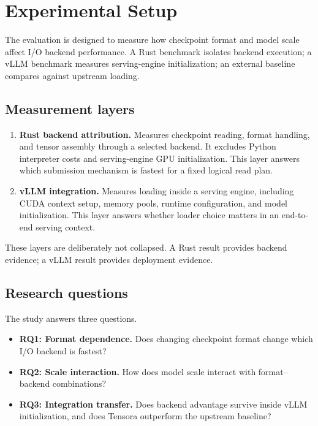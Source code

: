 \section{Experimental Setup}
\label{sec:experimental_setup}

The evaluation is designed to measure how checkpoint format and model scale affect I/O backend performance. A Rust benchmark isolates backend execution; a vLLM benchmark measures serving-engine initialization; an external baseline compares against upstream loading.

\subsection{Measurement layers}

\begin{enumerate}
\item \textbf{Rust backend attribution.} Measures checkpoint reading, format handling, and tensor assembly through a selected backend. It excludes Python interpreter costs and serving-engine GPU initialization. This layer answers which submission mechanism is fastest for a fixed logical read plan.
\item \textbf{vLLM integration.} Measures loading inside a serving engine, including CUDA context setup, memory pools, runtime configuration, and model initialization. This layer answers whether loader choice matters in an end-to-end serving context.
\end{enumerate}

These layers are deliberately not collapsed. A Rust result provides backend evidence; a vLLM result provides deployment evidence.

\subsection{Research questions}

The study answers three questions.
\begin{itemize}
\item \textbf{RQ1: Format dependence.} Does changing checkpoint format change which I/O backend is fastest?
\item \textbf{RQ2: Scale interaction.} How does model scale interact with format--backend combinations?
\item \textbf{RQ3: Integration transfer.} Does backend advantage survive inside vLLM initialization, and does Tensora outperform the upstream baseline?
\end{itemize}

